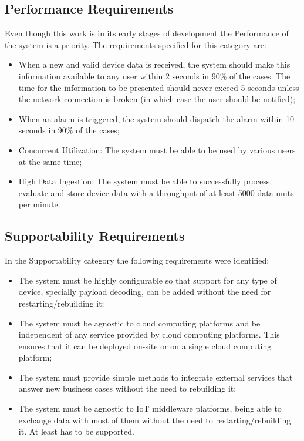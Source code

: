 \subsection{Performance Requirements}
\label{subsec:requirements:non_functional:performance}

Even though this work is in its early stages of development the Performance of the system is a priority. The requirements specified for this category are:

\begin{itemize}
    \item When a new and valid device data is received, the system should make this information available to any user within 2 seconds in 90\% of the cases. The time for the information to be presented should never exceed 5 seconds unless the network connection is broken (in which case the user should be notified);
    \item When an alarm is triggered, the system should dispatch the alarm within 10 seconds in 90\% of the cases;
    \item Concurrent Utilization: The system must be able to be used by various users at the same time;
    \item High Data Ingestion: The system must be able to successfully process, evaluate and store device data with a throughput of at least 5000 data units per minute.
\end{itemize}

\subsection{Supportability Requirements}
\label{subsec:requirements:non_functional:supportability}

In the Supportability category the following requirements were identified:

\begin{itemize}
    \item The system must be highly configurable so that support for any type of device, specially payload decoding, can be added without the need for restarting/rebuilding it;
    \item The system must be agnostic to cloud computing platforms and be independent of any service provided by cloud computing platforms. This ensures that it can be deployed on-site or on a single cloud computing platform;
    \item The system must provide simple methods to integrate external services that answer new business cases without the need to rebuilding it;
    \item The system must be agnostic to \gls{IoT} middleware platforms, being able to exchange data with most of them without the need to restarting/rebuilding it. At least  has to be supported.
\end{itemize}


